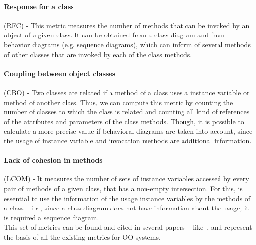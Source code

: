 \paragraph{Response for a class} (RFC) - This metric measures the number of methods that can be invoked by an object of a given class. It can be obtained from a class diagram and from behavior diagrams (e.g. sequence diagrams), which can inform of several methods of other classes that are invoked by each of the class methods.

\paragraph{Coupling between object classes} (CBO) - Two classes are related if a method of a class uses a instance variable or method of another class.
Thus, we can compute this metric by counting the number of classes to which the class is related and counting all kind of references of the attributes and parameters of the class methods.
Though, it is possible to calculate a more precise value if behavioral diagrams are taken into account, since the usage of instance variable and invocation methods are additional information.

\paragraph{Lack of cohesion in methods} (LCOM) - It measures the number of sets of instance variables accessed by every pair of methods of a given class, that has a non-empty intersection. For this, is essential to use the information of the usage instance variables by the methods of a class -- i.e., since a class diagram does not have information about the usage, it is required a sequence diagram.\\

This set of metrics can be found and cited in several papers -- like~\cite{Power2}, and represent the basis of all the existing metrics for OO systems.

